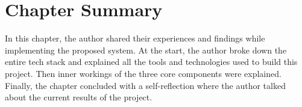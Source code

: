 \section{Chapter Summary}

In this chapter, the author shared their experiences and findings while implementing the proposed system. At the start, the author broke down the entire tech stack and explained all the tools and technologies used to build this project. Then inner workings of the three core components were explained. Finally, the chapter concluded with a self-reflection where the author talked about the current results of the project.